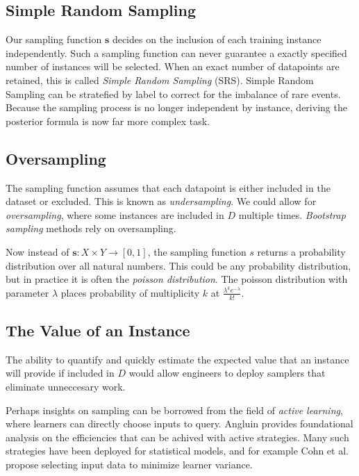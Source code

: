 \documentclass[twoside]{article}
\begin{document}
\subsection{Simple Random Sampling}

Our sampling function \(\mathbf{s}\) decides on the inclusion of each training instance independently. Such a sampling function can never guarantee a exactly specified number of instances will be selected. When an exact number of datapoints are retained, this is called \textit{Simple Random Sampling} (SRS). Simple Random Sampling can be stratefied by label to correct for the imbalance of rare events. Because the sampling process is no longer independent by instance, deriving the posterior formula is now far more complex task.

\subsection{Oversampling}

The sampling function assumes that each datapoint is either included in the dataset or excluded. This is known as \textit{undersampling}. We could allow for \textit{oversampling}, where some instances are included in \(D\) multiple times. \textit{Bootstrap sampling} methods rely on oversampling.

Now instead of \(\mathbf{s}: X \times Y \rightarrow \left [ 0, 1\right ]\), the sampling function \(s\) returns a probability distribution over all natural numbers. This could be any probability distribution, but in practice it is often the \textit{poisson distribution}. The poisson distribution with parameter \(\lambda\) places probability of multiplicity \(k\) at \(\frac{\lambda^k e^{-\lambda}}{k!}\).

\subsection{The Value of an Instance}

The ability to quantify and quickly estimate the expected value that an instance will provide if included in \(D\) would allow engineers to deploy samplers that eliminate unneccesary work.

Perhaps insights on sampling can be borrowed from the field of \textit{active learning}, where learners can directly choose inputs to query. Angluin\cite{angluin} provides foundational analysis on the efficiencies that can be achived with active strategies. Many such strategies have been deployed for statistical models, and for example Cohn et al.\cite{active} propose selecting input data to minimize learner variance.
\end{document}
